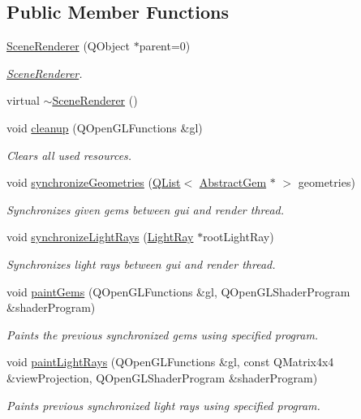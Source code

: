 \subsection*{Public Member Functions}
\begin{DoxyCompactItemize}
\item 
\hyperlink{class_scene_renderer_a12f72dc9b22e99ecdccaec38b6d2d512}{Scene\+Renderer} (Q\+Object $\ast$parent=0)
\begin{DoxyCompactList}\small\item\em \hyperlink{class_scene_renderer}{Scene\+Renderer}. \end{DoxyCompactList}\item 
virtual \hyperlink{class_scene_renderer_aceec75b5c04861c2a5c26349c2ba5748}{$\sim$\+Scene\+Renderer} ()
\item 
void \hyperlink{class_scene_renderer_a9dc118d75160651fb925410a68fef70f}{cleanup} (Q\+Open\+G\+L\+Functions \&gl)
\begin{DoxyCompactList}\small\item\em Clears all used resources. \end{DoxyCompactList}\item 
void \hyperlink{class_scene_renderer_a0cae4e7fdd5ef1fd4d38f480521433a9}{synchronize\+Geometries} (\hyperlink{singleton_q_list}{Q\+List}$<$ \hyperlink{class_abstract_gem}{Abstract\+Gem} $\ast$ $>$ geometries)
\begin{DoxyCompactList}\small\item\em Synchronizes given gems between gui and render thread. \end{DoxyCompactList}\item 
void \hyperlink{class_scene_renderer_a244d4002c0fe43988f1802057ba63fd2}{synchronize\+Light\+Rays} (\hyperlink{class_light_ray}{Light\+Ray} $\ast$root\+Light\+Ray)
\begin{DoxyCompactList}\small\item\em Synchronizes light rays between gui and render thread. \end{DoxyCompactList}\item 
void \hyperlink{class_scene_renderer_a809441cca9a5b772648f0d28e70df3fb}{paint\+Gems} (Q\+Open\+G\+L\+Functions \&gl, Q\+Open\+G\+L\+Shader\+Program \&shader\+Program)
\begin{DoxyCompactList}\small\item\em Paints the previous synchronized gems using specified program. \end{DoxyCompactList}\item 
void \hyperlink{class_scene_renderer_a6371e0e5c63e519fcf407f12d9d47262}{paint\+Light\+Rays} (Q\+Open\+G\+L\+Functions \&gl, const Q\+Matrix4x4 \&view\+Projection, Q\+Open\+G\+L\+Shader\+Program \&shader\+Program)
\begin{DoxyCompactList}\small\item\em Paints previous synchronized light rays using specified program. \end{DoxyCompactList}\end{DoxyCompactItemize}
